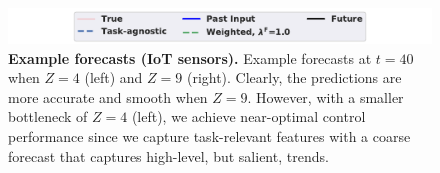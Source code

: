 \begin{figure}[ht]
\vskip 0.2in
\begin{center}

\includegraphics[width=0.8\columnwidth]{figures/forecast_legend_short.pdf}


\caption{\textbf{Example forecasts (IoT sensors).}  Example forecasts at $t=40$ when $Z=4$ (left) and $Z=9$ (right). 
Clearly, the predictions are more accurate and smooth when $Z=9$. However, with a smaller bottleneck of $Z=4$ (left), we achieve near-optimal control performance since we capture task-relevant features with a coarse forecast that captures high-level, but salient, trends.}
\label{fig:iot_forecasts}
\end{center}
\vskip -0.2in
\end{figure}


